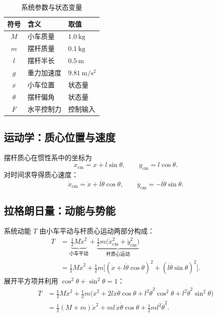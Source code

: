 \documentclass[11pt,a4paper]{article}
\begin{document}
\begin{table}[H]
\centering
\caption{系统参数与状态变量}
\label{tab:param}
\begin{tabular}{@{}cll@{}}
\toprule
符号 & 含义 & 取值 \\
\midrule
$M$ & 小车质量 & $1.0\ \mathrm{kg}$ \\
$m$ & 摆杆质量 & $0.1\ \mathrm{kg}$ \\
$l$ & 摆杆半长 & $0.5\ \mathrm{m}$ \\
$g$ & 重力加速度 & $9.81\ \mathrm{m/s^2}$ \\
$x$ & 小车位置 & 状态量 \\
$\theta$ & 摆杆偏角 & 状态量 \\
$F$ & 水平控制力 & 控制输入 \\
\bottomrule
\end{tabular}
\end{table}

\subsection{运动学：质心位置与速度}

摆杆质心在惯性系中的坐标为
\begin{equation}
    x_{\mathrm{cm}} = x + l\sin\theta, \qquad y_{\mathrm{cm}} = l\cos\theta .
\end{equation}
对时间求导得质心速度：
\begin{equation}
    \dot x_{\mathrm{cm}} = \dot x + l\dot\theta\cos\theta, \qquad
    \dot y_{\mathrm{cm}} = -l\dot\theta\sin\theta .
\end{equation}

\subsection{拉格朗日量：动能与势能}

系统动能 $T$ 由小车平动与杆质心运动两部分构成：
\begin{equation}
\begin{aligned}
    T &= \underbrace{\frac{1}{2}M\dot x^2}_{\text{小车平动}}
       + \underbrace{\frac{1}{2}m\big(\dot x_{\mathrm{cm}}^2 + \dot y_{\mathrm{cm}}^2\big)}_{\text{杆质心运动}} \\
      &= \frac{1}{2}M\dot x^2 + \frac{1}{2}m\Big[(\dot x + l\dot\theta\cos\theta)^2 + (l\dot\theta\sin\theta)^2\Big] .
\end{aligned}
\end{equation}
展开平方项并利用 $\cos^2\theta + \sin^2\theta = 1$：
\begin{equation}
\begin{aligned}
    T &= \frac{1}{2}M\dot x^2 + \frac{1}{2}m\big(\dot x^2 + 2l\dot x\dot\theta\cos\theta + l^2\dot\theta^2\cos^2\theta + l^2\dot\theta^2\sin^2\theta\big) \\
      &= \frac{1}{2}(M+m)\dot x^2 + ml\,\dot x\dot\theta\cos\theta + \frac{1}{2}ml^2\dot\theta^2 .
\end{aligned}
\end{equation}
\end{document}
